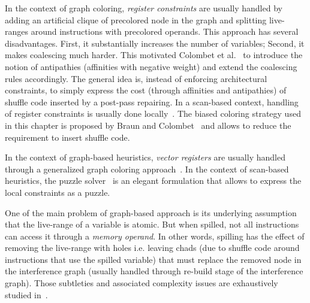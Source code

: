 {%
In the context of graph coloring, \emph{register constraints} are usually handled by adding an artificial clique of precolored node in the graph and splitting live-ranges around instructions with precolored operands.
This approach has several disadvantages.
First, it substantially increases the number of variables;
Second, it makes coalescing much harder.
This motivated Colombet et al.~\cite{ColombetOct11} to introduce the notion of antipathies (affinities with negative weight) and extend the coalescing rules accordingly.
The general idea is, instead of enforcing architectural constraints, to simply express the cost (through affinities and antipathies) of shuffle code inserted by a post-pass repairing.
In a scan-based context, handling of register constraints is usually done locally~\cite{linear-pfeifer,sarkar2007extended}.
The biased coloring strategy used in this chapter is proposed by Braun and Colombet~\cite{braun2010preference,ColombetOct11} and allows to reduce the requirement to insert shuffle code.

In the context of graph-based heuristics, \emph{vector registers} are usually handled through a generalized graph coloring approach~\cite{Smith04,Tavares}.
In the context of scan-based heuristics, the puzzle solver~\cite{Pereira:2008:PLDI} is an elegant formulation that allows to express the local constraints as a puzzle. 

One of the main problem of graph-based approach is its underlying assumption that the live-range of a variable is atomic.
But when spilled, not all instructions can access it through a \emph{memory operand}.
In other words, spilling has the effect of removing the live-range with holes i.e. leaving chads (due to shuffle code around instructions that use the spilled variable) that must replace the removed node in the interference graph (usually handled through re-build stage of the interference graph).
Those subtleties and associated complexity issues are exhaustively studied in~\cite{Bouchez07b}. 

}
